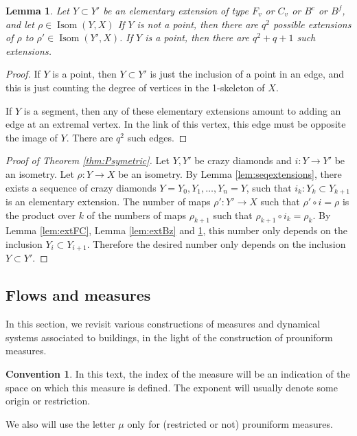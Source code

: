 \documentclass[a4paper, 11pt]{article}
\theoremstyle{plain}
\newtheorem{lemma}[proposition]{Lemma}
\theoremstyle{definition}
\newtheorem*{convention}{Convention}
\theoremstyle{remark}
\DeclareMathOperator{\Isom}{Isom}
\begin{document}
\begin{lemma}\label{lem:extdegenerate}
    Let $Y\subset Y'$ be an elementary extension of type $F_v$ or $C_v$ or $B^c$ or $B^f$, and let $\rho\in \Isom(Y,X)$  If $Y$ is not a point, then there are $q^2$ possible extensions of $\rho$ to $\rho'\in \Isom(Y', X)$. If $Y$ is a point, then there are $q^2+q+1$ such extensions.
\end{lemma}

\begin{proof}
    If $Y$ is a point, then $Y\subset Y'$ is just the inclusion of a point in an edge, and this is just counting the degree of vertices in the 1-skeleton of $X$. 

    If $Y$ is a segment, then any of these elementary extensions amount to adding an edge at an extremal vertex. In the link of this vertex, this edge must be opposite the image of $Y$. There are $q^2$ such edges.
\end{proof}

\begin{proof}[Proof of Theorem \ref{thm:Psymetric}]
Let $Y,Y'$ be  crazy diamonds and $i:Y\to Y'$ be an isometry. Let $\rho:Y\to X$ be an isometry. By Lemma \ref{lem:seqextensions}, there exists a sequence of crazy diamonds $Y=Y_0,Y_1,\dots, Y_n=Y$, such that $i_k:Y_k\subset Y_{k+1}$ is an elementary extension. The number of maps $\rho':Y'\to X$ such that $\rho'\circ i=\rho$ is the product over $k$ of the numbers of maps $\rho_{k+1}$ such that $\rho_{k+1}\circ i_k=\rho_k$. By Lemma \ref{lem:extFC}, Lemma \ref{lem:extBz} and \ref{lem:extdegenerate}, this number only depends on the inclusion $Y_i\subset Y_{i+1}$. Therefore the desired number only depends on the inclusion $Y\subset Y'$.
\end{proof}




\subsection{Flows and measures}\label{sec:flows}

In this section, we revisit various constructions of measures and dynamical systems associated to buildings, in the light of the construction of prouniform measures.


\begin{convention}
In this text, the index of the measure will be an indication of the space on which this measure is defined. The exponent will usually denote some origin or restriction.

We also will use the letter $\mu$ only for (restricted or not) prouniform measures.
\end{convention}
\end{document}
